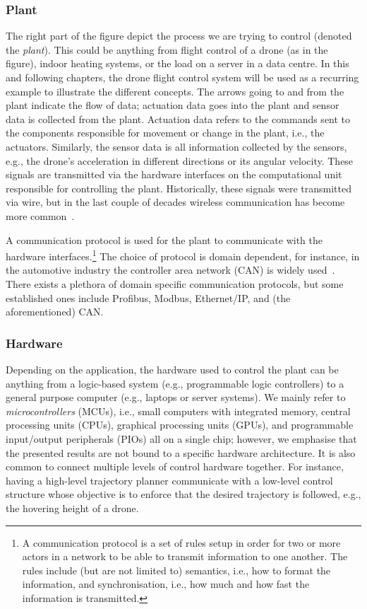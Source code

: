 \subsubsection{Plant}%
%
The right part of the figure depict the process we are trying to control (denoted the \emph{plant}).
This could be anything from flight control of a drone (as in the figure), indoor heating systems, or the load on a server in a data centre.
In this and following chapters, the drone flight control system will be used as a recurring example to illustrate the different concepts.
The arrows going to and from the plant indicate the flow of data; actuation data goes into the plant and sensor data is collected from the plant.
Actuation data refers to the commands sent to the components responsible for movement or change in the plant, i.e., the actuators.
Similarly, the sensor data is all information collected by the sensors, e.g., the drone's acceleration in different directions or its angular velocity.
These signals are transmitted via the hardware interfaces on the computational unit responsible for controlling the plant.
Historically, these signals were transmitted via wire, but in the last couple of decades wireless communication has become more common~\cite{Park:2018}.

A communication protocol is used for the plant to communicate with the hardware interfaces.\footnote{A communication protocol is a set of rules setup in order for two or more actors in a network to be able to transmit information to one another. The rules include (but are not limited to) semantics, i.e., how to format the information, and synchronisation, i.e., how much and how fast the information is transmitted.}
The choice of protocol is domain dependent, for instance, in the automotive industry the controller area network (CAN) is widely used~\cite{Voss:2005}.
There exists a plethora of domain specific communication protocols, but some established ones include Profibus, Modbus, Ethernet/IP, and (the aforementioned) CAN.

\subsubsection{Hardware}%
%
Depending on the application, the hardware used to control the plant can be anything from a logic-based system (e.g., programmable logic controllers) to a general purpose computer (e.g., laptops or server systems).
We mainly refer to \emph{microcontrollers} (MCUs), i.e., small computers with integrated memory, central processing units (CPUs), graphical processing units (GPUs), and programmable input/output peripherals (PIOs) all on a single chip; however, we emphasise that the presented results are not bound to a specific hardware architecture.
It is also common to connect multiple levels of control hardware together.
For instance, having a high-level trajectory planner communicate with a low-level control structure whose objective is to enforce that the desired trajectory is followed, e.g., the hovering height of a drone.

